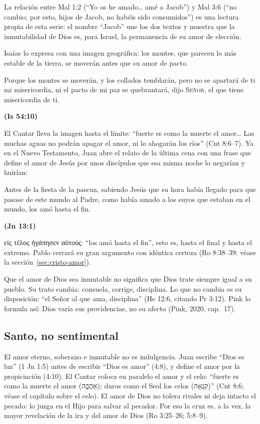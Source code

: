 \documentclass[11pt,letterpaper]{article}
\newcommand{\heb}[1]{\mbox{\foreignlanguage{hebrew}{#1}}}
\newcommand{\grc}[1]{\foreignlanguage{ancientgreek}{#1}}
\newcommand{\SENOR}{\textsc{Señor}}
\newcommand{\fuente}[1]{\par\hfill{\upshape\bfseries\small\textcolor{azul}{#1}}}
\begin{document}
\begin{nota}[Precisión]
La relación entre Mal 1:2 (``Yo os he amado\ldots{} amé a Jacob'') y Mal 3:6 (``no cambio; por esto, hijos de Jacob, no habéis sido consumidos'') es una lectura propia de esta serie: el nombre ``Jacob'' une los dos textos y muestra que la inmutabilidad de Dios es, para Israel, la permanencia de su amor de elección.
\end{nota}

Isaías lo expresa con una imagen geográfica: los montes, que parecen lo más estable de la tierra, se moverán antes que su amor de pacto.

\begin{cita}Porque los montes se moverán, y los collados temblarán, pero no se apartará de ti mi misericordia, ni el pacto de mi paz se quebrantará, dijo \SENOR, el que tiene misericordia de ti.\fuente{(Is 54:10)}\end{cita}

El Cantar lleva la imagen hasta el límite: ``fuerte es como la muerte el amor\ldots{} Las muchas aguas no podrán apagar el amor, ni lo ahogarán los ríos'' (Cnt 8:6--7). Ya en el Nuevo Testamento, Juan abre el relato de la última cena con una frase que define el amor de Jesús por unos discípulos que esa misma noche lo negarían y huirían:

\begin{cita}Antes de la fiesta de la pascua, sabiendo Jesús que su hora había llegado para que pasase de este mundo al Padre, como había amado a los suyos que estaban en el mundo, los amó hasta el fin.\fuente{(Jn 13:1)}\end{cita}

\grc{εἰς τέλος ἠγάπησεν αὐτούς}: ``los amó hasta el fin'', esto es, hasta el final y hasta el extremo. Pablo cerrará su gran argumento con idéntica certeza (Ro 8:38--39; véase la sección~\ref{sec:cristo-amor}).

\begin{nota}[Precisión]
Que el amor de Dios sea inmutable no significa que Dios trate siempre igual a su pueblo. Su trato cambia: consuela, corrige, disciplina. Lo que no cambia es su disposición: ``el Señor al que ama, disciplina'' (He 12:6, citando Pr 3:12). Pink lo formula así: Dios varía sus providencias, no su afecto (Pink, 2020, cap.~17).
\end{nota}

\subsection{Santo, no sentimental}
El amor eterno, soberano e inmutable no es indulgencia. Juan escribe ``Dios es luz'' (1 Jn 1:5) antes de escribir ``Dios es amor'' (4:8), y define el amor por la propiciación (4:10). El Cantar coloca en paralelo el amor y el celo: ``fuerte es como la muerte el amor (\heb{אַהֲבָה}); duros como el Seol los celos (\heb{קִנְאָה})'' (Cnt 8:6; véase el capítulo sobre el celo). El amor de Dios no tolera rivales ni deja intacto el pecado: lo juzga en el Hijo para salvar al pecador. Por eso la cruz es, a la vez, la mayor revelación de la ira y del amor de Dios (Ro 3:25--26; 5:8--9).
\end{document}
